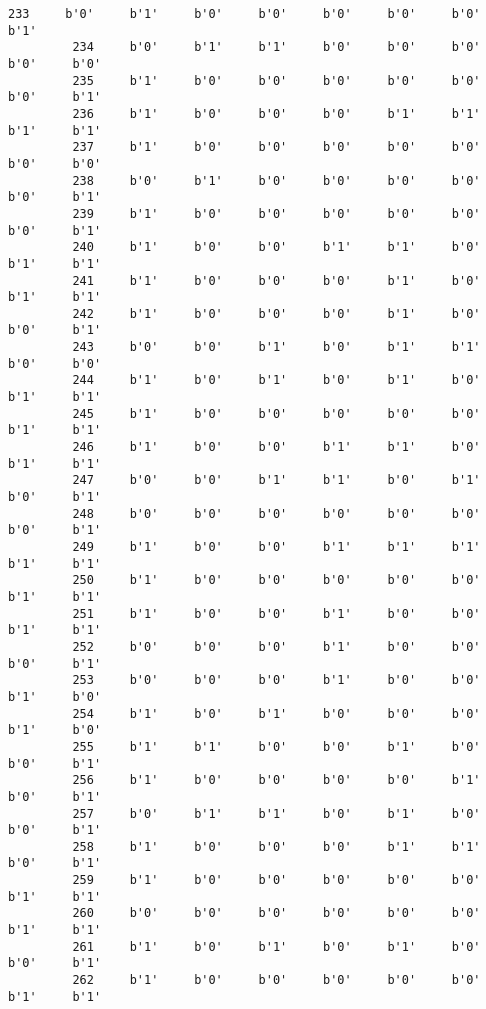 \documentclass[11pt]{article}
\begin{document}
\begin{Verbatim}[commandchars=\\\{\}]
         233     b'0'     b'1'     b'0'     b'0'     b'0'     b'0'     b'0'     b'1'   
         234     b'0'     b'1'     b'1'     b'0'     b'0'     b'0'     b'0'     b'0'   
         235     b'1'     b'0'     b'0'     b'0'     b'0'     b'0'     b'0'     b'1'   
         236     b'1'     b'0'     b'0'     b'0'     b'1'     b'1'     b'1'     b'1'   
         237     b'1'     b'0'     b'0'     b'0'     b'0'     b'0'     b'0'     b'0'   
         238     b'0'     b'1'     b'0'     b'0'     b'0'     b'0'     b'0'     b'1'   
         239     b'1'     b'0'     b'0'     b'0'     b'0'     b'0'     b'0'     b'1'   
         240     b'1'     b'0'     b'0'     b'1'     b'1'     b'0'     b'1'     b'1'   
         241     b'1'     b'0'     b'0'     b'0'     b'1'     b'0'     b'1'     b'1'   
         242     b'1'     b'0'     b'0'     b'0'     b'1'     b'0'     b'0'     b'1'   
         243     b'0'     b'0'     b'1'     b'0'     b'1'     b'1'     b'0'     b'0'   
         244     b'1'     b'0'     b'1'     b'0'     b'1'     b'0'     b'1'     b'1'   
         245     b'1'     b'0'     b'0'     b'0'     b'0'     b'0'     b'1'     b'1'   
         246     b'1'     b'0'     b'0'     b'1'     b'1'     b'0'     b'1'     b'1'   
         247     b'0'     b'0'     b'1'     b'1'     b'0'     b'1'     b'0'     b'1'   
         248     b'0'     b'0'     b'0'     b'0'     b'0'     b'0'     b'0'     b'1'   
         249     b'1'     b'0'     b'0'     b'1'     b'1'     b'1'     b'1'     b'1'   
         250     b'1'     b'0'     b'0'     b'0'     b'0'     b'0'     b'1'     b'1'   
         251     b'1'     b'0'     b'0'     b'1'     b'0'     b'0'     b'1'     b'1'   
         252     b'0'     b'0'     b'0'     b'1'     b'0'     b'0'     b'0'     b'1'   
         253     b'0'     b'0'     b'0'     b'1'     b'0'     b'0'     b'1'     b'0'   
         254     b'1'     b'0'     b'1'     b'0'     b'0'     b'0'     b'1'     b'0'   
         255     b'1'     b'1'     b'0'     b'0'     b'1'     b'0'     b'0'     b'1'   
         256     b'1'     b'0'     b'0'     b'0'     b'0'     b'1'     b'0'     b'1'   
         257     b'0'     b'1'     b'1'     b'0'     b'1'     b'0'     b'0'     b'1'   
         258     b'1'     b'0'     b'0'     b'0'     b'1'     b'1'     b'0'     b'1'   
         259     b'1'     b'0'     b'0'     b'0'     b'0'     b'0'     b'1'     b'1'   
         260     b'0'     b'0'     b'0'     b'0'     b'0'     b'0'     b'1'     b'1'   
         261     b'1'     b'0'     b'1'     b'0'     b'1'     b'0'     b'0'     b'1'   
         262     b'1'     b'0'     b'0'     b'0'     b'0'     b'0'     b'1'     b'1'   

\end{Verbatim}
\end{document}
